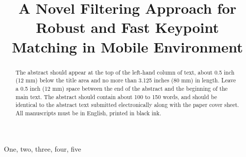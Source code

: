 \documentclass{article}
\title{A Novel Filtering Approach for Robust and Fast Keypoint Matching in Mobile Environment}
\begin{document}
%
\maketitle
%
\begin{abstract}
The abstract should appear at the top of the left-hand column of text, about
0.5 inch (12 mm) below the title area and no more than 3.125 inches (80 mm) in
length.  Leave a 0.5 inch (12 mm) space between the end of the abstract and the
beginning of the main text.  The abstract should contain about 100 to 150
words, and should be identical to the abstract text submitted electronically
along with the paper cover sheet.  All manuscripts must be in English, printed
in black ink.
\end{abstract}
%
\begin{keywords}
One, two, three, four, five
\end{keywords}
%














% 

\end{document}
